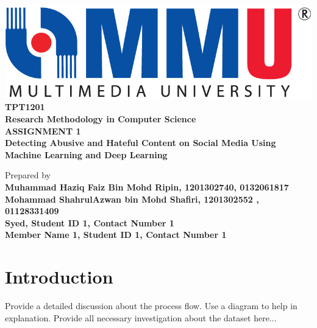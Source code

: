 \documentclass[12pt,a4paper,oneside]{article}
\begin{document}
\begin{center}

\includegraphics[scale=0.30]{mmu.png}\\
\vspace{1cm}
\Large{\textbf{TPT1201 \\Research Methodology in Computer Science}} \\
\vspace{2.5cm}
\Large{\textbf{ASSIGNMENT 1}} \\
\vspace{1cm}
\Large{\textbf{Detecting Abusive and Hateful Content on Social Media Using Machine Learning and Deep Learning}} \\
\vspace{1cm}
 


\vspace{3.5cm}


\normalsize{Prepared by} \\
\vspace{2.5cm}
\large{\textbf{Muhammad Haziq Faiz Bin Mohd Ripin, 1201302740, 0132061817}} \\ 
\large{\textbf{Mohammad ShahrulAzwan bin Mohd Shafiri, 1201302552 , 01128331409}} \\ 
\large{\textbf{Syed, Student ID 1, Contact Number 1}} \\
\large{\textbf{Member Name 1, Student ID 1, Contact Number 1}} \\ 
 

\end{center}

\thispagestyle{empty}
 
\clearpage 


\section{Introduction}

Provide a detailed discussion about the process flow. Use a diagram to help in explanation. Provide all necessary investigation about the dataset here...
\end{document}
